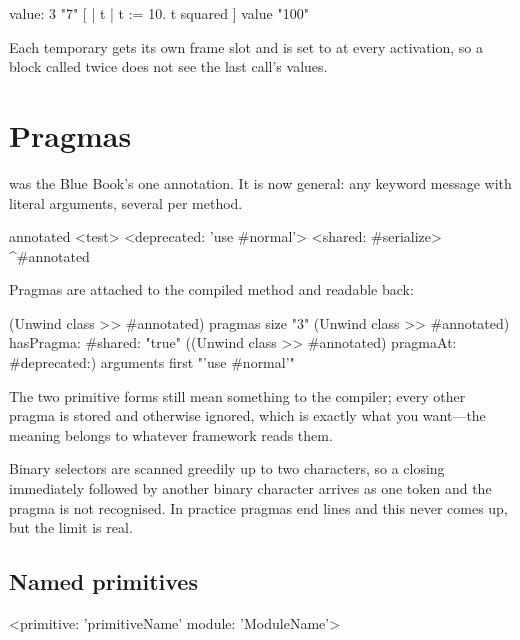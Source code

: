 \begin{st}
[:x | | doubled | doubled := x * 2. doubled + 1] value: 3      "7"
[ | t | t := 10. t squared ] value                             "100"
\end{st}

Each temporary gets its own frame slot and is set to  at every
activation, so a block called twice does not see the last call's values.

\section{Pragmas}

 was the Blue Book's one annotation. It is now general:
any keyword message with literal arguments, several per method.

\begin{st}
annotated
    <test>
    <deprecated: 'use #normal'>
    <shared: #serialize>
    ^#annotated
\end{st}

Pragmas are attached to the compiled method and readable back:

\begin{st}
(Unwind class >> #annotated) pragmas size                        "3"
(Unwind class >> #annotated) hasPragma: #shared:                 "true"
((Unwind class >> #annotated) pragmaAt: #deprecated:) arguments first  "'use #normal'"
\end{st}

The two primitive forms still mean something to the compiler; every other
pragma is stored and otherwise ignored, which is exactly what you want---the
meaning belongs to whatever framework reads them.

\begin{stnote}
Binary selectors are scanned greedily up to two characters, so a closing
\ct{>} immediately followed by another binary character arrives as one token
and the pragma is not recognised. In practice pragmas end lines and this never
comes up, but the limit is real.
\end{stnote}

\subsection{Named primitives}

\begin{st}
<primitive: 'primitiveName' module: 'ModuleName'>
\end{st}

